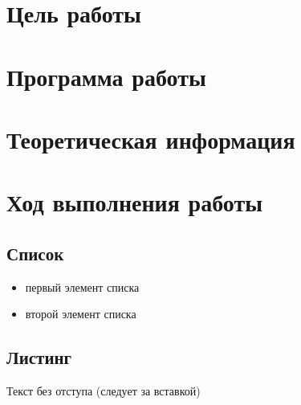 





\tableofcontents
\newpage



\section{Цель работы}


\section{Программа работы}


\section{Теоретическая информация}


\section{Ход выполнения работы}

\subsection{Список}

\begin{itemize}
\item первый элемент списка
\item второй элемент списка
\end{itemize}





\subsection{Листинг}


\parindent=1cm %
Текст без отступа (следует за вставкой)

